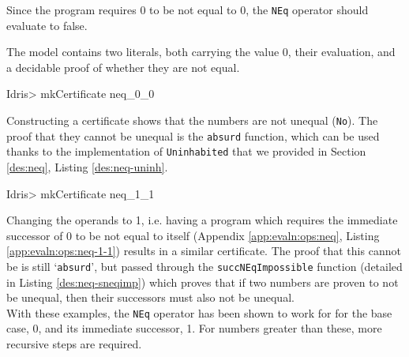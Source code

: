         
        
        
        Since the program requires 0 to be not equal to 0, the \texttt{NEq} operator should evaluate to false.
        
        
        The \Idris model contains two literals, both carrying the value 0, their evaluation, and a decidable proof of whether they are not equal.
        
        \begin{code}
Idris> mkCertificate neq_0_0
        \end{code}
        
        Constructing a certificate shows that the numbers are not unequal (\texttt{No}). The proof that they cannot be unequal is the \texttt{absurd} function, which can be used thanks to the implementation of \texttt{Uninhabited} that we provided in Section \ref{des:neq}, Listing \ref{des:neq-uninh}.
        
        \begin{code}
Idris> mkCertificate neq_1_1
        \end{code}
        
        Changing the operands to 1, i.e. having a program which requires the immediate successor of 0 to be not equal to itself (Appendix \ref{app:evaln:ops:neq}, Listing \ref{app:evaln:ops:neq-1-1}) results in a similar certificate. The proof that this cannot be is still `\texttt{absurd}', but passed through the \texttt{succNEqImpossible} function (detailed in Listing \ref{des:neq-sneqimp}) which proves that if two numbers are proven to not be unequal, then their successors must also not be unequal.
        \\
        
        With these examples, the \texttt{NEq} operator has been shown to work for for the base case, 0, and its immediate successor, 1. For numbers greater than these, more recursive steps are required.
        
        \newpage
    
        
        
